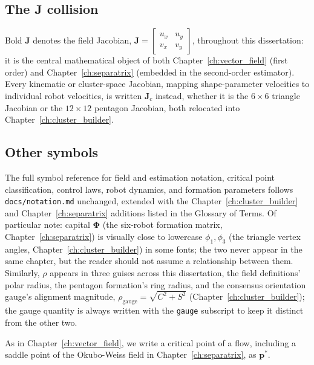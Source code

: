 \documentclass[12pt, letterpaper, oneside]{report}
\begin{document}
\subsection*{The \texorpdfstring{$\mathbf{J}$}{J} collision}

Bold $\mathbf{J}$ denotes the field Jacobian, $\mathbf{J} =
\left[\begin{smallmatrix} u_x & u_y \\ v_x & v_y \end{smallmatrix}\right]$,
throughout this dissertation: it is the central mathematical object of both
Chapter~\ref{ch:vector_field} (first order) and Chapter~\ref{ch:separatrix}
(embedded in the second-order estimator). Every kinematic or cluster-space
Jacobian, mapping shape-parameter velocities to individual robot velocities,
is written $\mathbf{J}_c$ instead, whether it is the $6\times 6$ triangle
Jacobian or the $12\times 12$ pentagon Jacobian, both relocated into
Chapter~\ref{ch:cluster_builder}.

\subsection*{Other symbols}

The full symbol reference for field and estimation notation, critical point
classification, control laws, robot dynamics, and formation parameters
follows \texttt{docs/notation.md} unchanged, extended with the
Chapter~\ref{ch:cluster_builder} and Chapter~\ref{ch:separatrix} additions
listed in the Glossary of Terms. Of particular note: capital $\boldsymbol{\Phi}$
(the six-robot formation matrix, Chapter~\ref{ch:separatrix}) is visually
close to lowercase $\phi_1, \phi_3$ (the triangle vertex angles,
Chapter~\ref{ch:cluster_builder}) in some fonts; the two never appear in the
same chapter, but the reader should not assume a relationship between them.
Similarly, $\rho$ appears in three guises across this dissertation, the field
definitions' polar radius, the pentagon formation's ring radius, and the
consensus orientation gauge's alignment magnitude, $\rho_{\text{gauge}} =
\sqrt{C^2+S^2}$ (Chapter~\ref{ch:cluster_builder}); the gauge quantity is
always written with the \texttt{gauge} subscript to keep it distinct from the
other two.

As in Chapter~\ref{ch:vector_field}, we write a critical point of a flow,
including a saddle point of the Okubo-Weiss field in
Chapter~\ref{ch:separatrix}, as $\mathbf{p}^*$.

\end{document}
